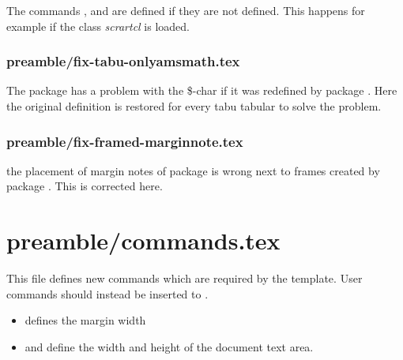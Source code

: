 The commands ,  and  are defined if they are not defined. This happens for example if the class \emph{scrartcl} is loaded.


\subsubsection{preamble/fix-tabu-onlyamsmath.tex}

The package  has a problem with the \$-char if it was redefined by package . Here the original definition is restored for every tabu tabular to solve the problem.


\subsubsection{preamble/fix-framed-marginnote.tex}

the placement of margin notes of package  is wrong next to frames created by package . This is corrected here.



\section{preamble/commands.tex}

This file defines new commands which are required by the template. User commands should instead be inserted to .

\begin{itemize}
\item {} defines the margin width
\item {} and  define the width and height of the document text area.
\end{itemize}


